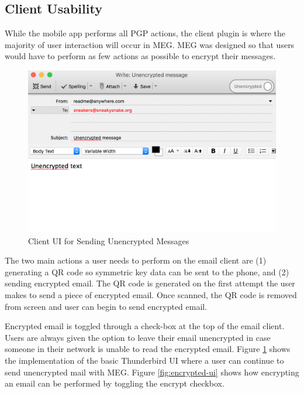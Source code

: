 \documentclass{sig-alternate-05-2015}
\begin{document}
\subsection{Client Usability}
\par While the mobile app performs all PGP actions, the client plugin is where the majority of user interaction will occur in MEG. MEG was designed so that users would have to perform as few actions as possible to encrypt their messages.
\begin{figure}[H]
    \centering
    \includegraphics[scale=.4]{unencrypted-client-ui.png}
    \caption{Client UI for Sending Unencrypted Messages}
    \label{fig:unencrypted-ui}
\end{figure}
\par The two main actions a user needs to perform on the email client are (1) generating a QR code so symmetric key data can be sent to the phone, and (2) sending encrypted email. The QR code is generated on the first attempt the user makes to send a piece of encrypted email. Once scanned, the QR code is removed from screen and user can begin to send encrypted email.
\par Encrypted email is toggled through a check-box at the top of the email client. Users are always given the option to leave their email unencrypted in case someone in their network is unable to read the encrypted email. Figure \ref{fig:unencrypted-ui} shows the implementation of the basic Thunderbird UI where a user can continue to send unencrypted mail with MEG. Figure \ref{fig:encrypted-ui} shows how encrypting an email can be performed by toggling the encrypt checkbox.
\end{document}
